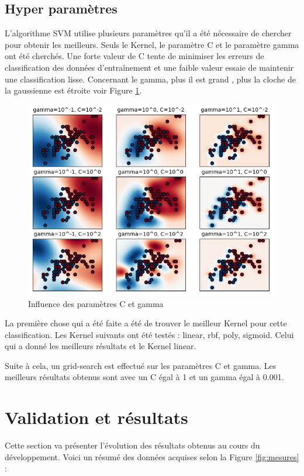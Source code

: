 \subsection{Hyper paramètres}
L'algorithme SVM utilise plusieurs paramètres qu'il a été nécessaire de chercher pour obtenir les meilleurs. Seuls le Kernel, le paramètre C et le paramètre gamma ont été cherchés. Une forte valeur de C tente de minimiser les erreurs de classification des données d'entraînement et une faible valeur essaie de maintenir une classification lisse. Concernant le gamma, plus il est grand , plus la cloche de la gaussienne est étroite voir Figure \ref{fig:c_gamma}. 

\begin{figure}[htp]
 \begin{center}
  \includegraphics[scale=0.7]{figures/c_gamma_param.png}
  \caption{Influence des paramètres C et gamma}
  \label{fig:c_gamma} %
 \end{center}
\end{figure}

La première chose qui a été faite a été de trouver le meilleur Kernel pour cette classification. Les Kernel suivants ont été testés : linear, rbf, poly, sigmoid. Celui qui a donné les meilleurs résultats et le Kernel linear.

Suite à cela, un grid-search est effectué sur les paramètres C et gamma. Les meilleurs résultats obtenus sont avec un C égal à 1 et un gamma égal à 0.001. 

\section{Validation et résultats}
Cette section va présenter l'évolution des résultats obtenus au cours du développement. Voici un résumé des données acquises selon la Figure \ref{fig:mesures} : 


